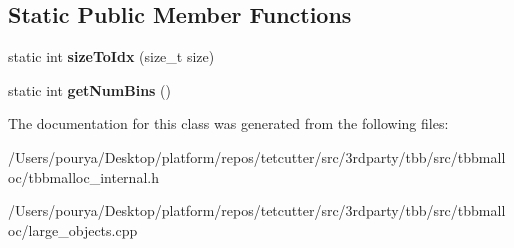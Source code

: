 \subsection*{Static Public Member Functions}
\begin{DoxyCompactItemize}
\item 
\hypertarget{classrml_1_1internal_1_1LargeObjectCacheImpl_ac554d480cadb2599e4505c78ad87965b}{}static int {\bfseries size\+To\+Idx} (size\+\_\+t size)\label{classrml_1_1internal_1_1LargeObjectCacheImpl_ac554d480cadb2599e4505c78ad87965b}

\item 
\hypertarget{classrml_1_1internal_1_1LargeObjectCacheImpl_ac486847027ec75f037fbadbc79e7f7ff}{}static int {\bfseries get\+Num\+Bins} ()\label{classrml_1_1internal_1_1LargeObjectCacheImpl_ac486847027ec75f037fbadbc79e7f7ff}

\end{DoxyCompactItemize}


The documentation for this class was generated from the following files\+:\begin{DoxyCompactItemize}
\item 
/\+Users/pourya/\+Desktop/platform/repos/tetcutter/src/3rdparty/tbb/src/tbbmalloc/tbbmalloc\+\_\+internal.\+h\item 
/\+Users/pourya/\+Desktop/platform/repos/tetcutter/src/3rdparty/tbb/src/tbbmalloc/large\+\_\+objects.\+cpp\end{DoxyCompactItemize}
